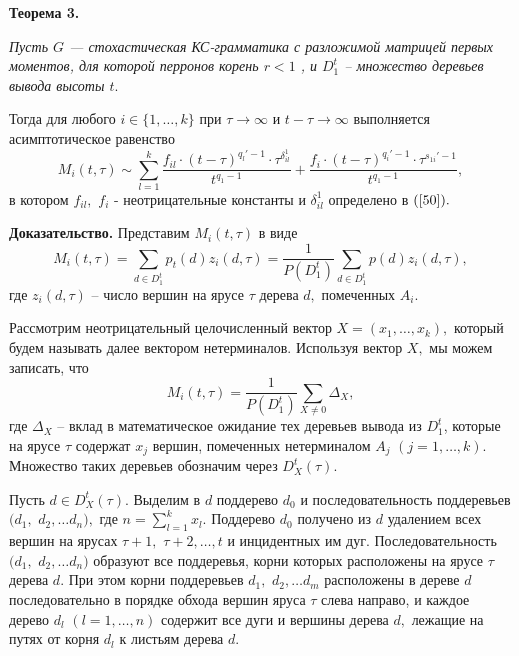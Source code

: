 \documentclass[12pt,russian]{article}
\begin{document}
{%
\medskip

\textbf {Теорема 3.}
{\em Пусть $G$ --- стохастическая КС-грамматика с разложимой
матрицей первых моментов, для которой перронов корень $r<1$ , и $D^t_1$ -- множество деревьев вывода
высоты $t.$

Тогда для любого $i \in \{1, \ldots, k\}$ при $\tau \rightarrow \infty $
и $t-\tau \rightarrow \infty $
выполняется асимптотическое равенство
$$
M_i(t,\tau)\sim
\sum_{l =1}^k \frac{f_{il} \cdot (t-\tau)^{q_l'-1}\cdot \tau^{\delta_{il}^1}}{t^{q_1-1}}+ \frac {f_i \cdot(t-\tau)^{q_i'-1} \cdot \tau^{s_{1i}'-1} }{t^{q_1-1}},
$$
в котором $f_{il},$ $f_{i}$ - неотрицательные константы и $\delta_{il}^1$ определено в $(\ref{50}).$


}

\medskip

\textbf {Доказательство.}
Представим $M_i(t,\tau)$ в виде
$$
M_i(t,\tau)=\sum_{d \in D^t_1} p_t(d) z_{i}(d,\tau)=\frac{1}{P(D_1^t)}\sum_{d \in D^t_1} p(d) z_{i}(d,\tau),
$$
где $z_i (d,\tau)$ --  число вершин на ярусе $\tau$ дерева $d,$
помеченных $A_i.$

Рассмотрим неотрицательный целочисленный вектор $X=(x_1,\ldots,x_k),$
который будем называть далее вектором нетерминалов.
Используя вектор $X,$ мы можем записать, что
$$
M_i(t,\tau)= \frac{1}{P(D_1^t)}\sum_{X \ne 0} \Delta_X,
$$
где $\Delta_X$ -- вклад в математическое ожидание тех деревьев вывода
из $D^t_1$, которые на ярусе $\tau$ содержат $x_j$ вершин, помеченных
нетерминалом $A_j$ $(j=1,\ldots, k).$ Множество таких деревьев обозначим
через $D_X^t(\tau).$

Пусть $d \in D_X^t(\tau).$ Выделим в $d$ поддерево $d_0$ и последовательность
поддеревьев $(d_1,$ $d_2, \ldots d_n),$ где $n=\sum_{l=1}^k x_l.$
Поддерево $d_0$ получено из $d$ удалением всех вершин на ярусах
$\tau+1,$ $\tau+2, \ldots, t$ и инцидентных им дуг. Последовательность
$(d_1,$ $d_2, \ldots d_n)$ образуют все поддеревья, корни которых расположены
на ярусе $\tau$ дерева $d.$
При этом корни поддеревьев $d_1,$ $d_2, \ldots d_m$ расположены в дереве $d$
последовательно в порядке обхода вершин яруса $\tau$ слева направо, и каждое
дерево $d_l$ $(l=1,\ldots,n)$ содержит все дуги и вершины дерева $d,$
лежащие на путях от корня $d_l$ к листьям дерева $d.$

}
\end{document}
